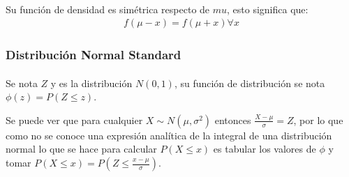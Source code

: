 \documentclass[../main.tex]{subfiles}
\begin{document}
\paragraph{} Su función de densidad es simétrica respecto de \(mu\), esto significa que:
\begin{gather*}
  f(\mu - x) = f(\mu + x) \forall x
\end{gather*}

\subsubsection{Distribución Normal Standard}

\paragraph{} Se nota \(Z\) y es la distribución \(N(0, 1)\), su función de distribución se nota \(\phi(z) = P(Z \leq z)\).

Se puede ver que para cualquier \(X \sim N(\mu, \sigma^{2})\) entonces \(\frac{X - \mu}{\sigma} = Z\), por lo que como no se conoce una expresión analítica de la integral de una distribución normal lo que se hace para calcular \(P(X \leq x)\) es tabular los valores de \(\phi\) y tomar \(P(X \leq x) = P(Z \leq \frac{x - \mu}{\sigma})\).
\end{document}
